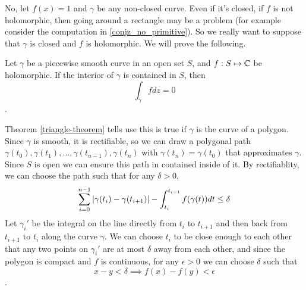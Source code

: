 \documentclass{homework}
\begin{document}
                                                                                                                                                    \begin{solution}
                                                                                                                                                     No, let $f(x)=1$ and $\gamma$ be any non-closed curve. Even if it's closed, if $f$ is not holomorphic, then going around a rectangle may be a problem (for example consider the computation in \ref{conjz_no_primitive}). So we really want to suppose that $\gamma$ is closed and $f$ is holomorphic. We will prove the following.
                                                                                                                                                     \begin{theorem}\label{general-curve-theorem}
                                                                                                                                                     Let $\gamma$ be a piecewise smooth curve in an open set $S$, and $f:S\mapsto \mathbb{C}$ be holomorphic. If the interior of $\gamma$ is contained in $S$, then \[\int_{\gamma} fdz = 0\].
                                                                                                                                                     \end{theorem}
                                                                                                                                                     Theorem \ref{triangle-theorem} tells use this is true if $\gamma$ is the curve of a polygon. Since $\gamma$ is smooth, it is rectifiable, so we can draw a polygonal path $\gamma(t_0), \gamma(t_1), \dots, \gamma(t_{n-1}), \gamma(t_n)$ with $\gamma(t_n)=\gamma(t_0)$ that approximates $\gamma$. Since $S$ is open we can ensure this path in contained inside of it. By rectifiablity, we can choose the path such that for any $\delta > 0$,
                                                                                                                                                     \[\sum_{i=0}^{n-1}\left|\gamma(t_i) - \gamma(t_{i+1})\right| - \int_{t_i}^{t_{i+1}} f(\gamma(t)) dt \leq \delta \]
                                                                                                                                                     Let $\gamma_{i}'$ be the integral on the line directly from $t_i$ to $t_{i+1}$ and then back from $t_{i+1}$ to $t_{i}$ along the curve $\gamma$. We can choose $t_i$ to be close enough to each other that any two points on $\gamma_{i}'$ are at most $\delta$ away from each other, and since the polygon is compact and $f$ is continuous, for any $\epsilon > 0$ we can choose $\delta$ such that 
                                                                                                                                                     \[x - y < \delta \implies f(x) - f(y) < \epsilon\].


\end{solution}
\end{document}
